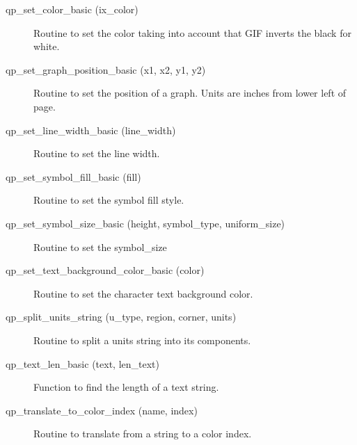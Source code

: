\begin{description}
\label{r:qp.set.color.basic}
\item[qp_set_color_basic (ix_color)  ] \Newline 
Routine to set the color taking into account that GIF
inverts the black for white.

\label{r:qp.set.graph.position.basic}
\item[qp_set_graph_position_basic (x1, x2, y1, y2)] \Newline 
Routine to set the position of a graph.
Units are inches from lower left of page.

\label{r:qp.set.line.width.basic}
\item[qp_set_line_width_basic (line_width)] \Newline 
Routine to set the line width.

\label{r:qp.set.symbol.fill.basic}
\item[qp_set_symbol_fill_basic (fill)] \Newline 
Routine to set the symbol fill style.

\label{r:qp.set.symbol.size.basic}
\item[qp_set_symbol_size_basic (height, symbol_type, uniform_size)] \Newline 
Routine to set the symbol_size

\label{r:qp.set.text.background.color.basic}
\item[qp_set_text_background_color_basic (color)] \Newline 
Routine to set the character text background color.

\label{r:qp.split.units.string}
\item[qp_split_units_string (u_type, region, corner, units)] \Newline 
     Routine to split a units string into its components.

\label{r:qp.text.len.basic}
\item[qp_text_len_basic (text, len_text)] \Newline 
Function to find the length of a text string.

\label{r:qp.translate.to.color.index}
\item[qp_translate_to_color_index (name, index)] \Newline 
     Routine to translate from a string to a color index.

\end{description}

